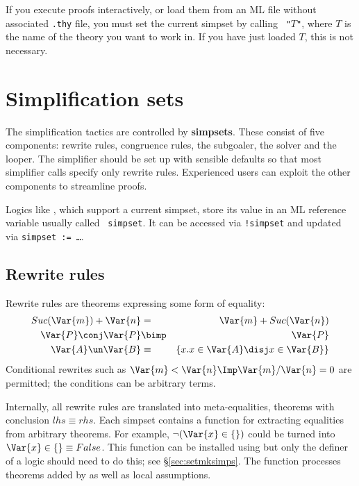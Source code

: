 \begin{warn}
  If you execute proofs interactively, or load them from an ML file without
  associated {\tt .thy} file, you must set the current simpset by calling
  ~{\tt"}$T${\tt"}, where $T$ is the name of the
  theory you want to work in. If you have just loaded $T$, this is not
  necessary.
\end{warn}


\section{Simplification sets} 
The simplification tactics are controlled by {\bf simpsets}.  These consist
of five components: rewrite rules, congruence rules, the subgoaler, the
solver and the looper.  The simplifier should be set up with sensible
defaults so that most simplifier calls specify only rewrite rules.
Experienced users can exploit the other components to streamline proofs.

Logics like \HOL, which support a current simpset,
store its value in an ML reference variable usually called {\tt
  simpset}. It can be accessed via
{\tt!simpset} and updated via {\tt simpset := \dots}.

\subsection{Rewrite rules}
Rewrite rules are theorems expressing some form of equality:
\begin{eqnarray*}
  Suc(\Var{m}) + \Var{n} &=&      \Var{m} + Suc(\Var{n}) \\
  \Var{P}\conj\Var{P}    &\bimp&  \Var{P} \\
  \Var{A} \un \Var{B} &\equiv& \{x.x\in \Var{A} \disj x\in \Var{B}\}
\end{eqnarray*}
Conditional rewrites such as $\Var{m}<\Var{n} \Imp \Var{m}/\Var{n} =
0$ are permitted; the conditions can be arbitrary terms.

Internally, all rewrite rules are translated into meta-equalities, theorems
with conclusion $lhs \equiv rhs$.  Each simpset contains a function for
extracting equalities from arbitrary theorems.  For example,
$\neg(\Var{x}\in \{\})$ could be turned into $\Var{x}\in \{\} \equiv
False$.  This function can be installed using  but only
the definer of a logic should need to do this; see \S\ref{sec:setmksimps}.
The function processes theorems added by  as well as
local assumptions.


